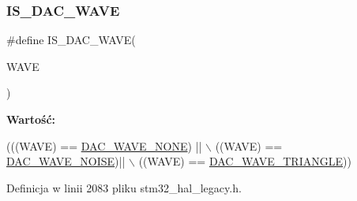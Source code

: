 \subsubsection{\texorpdfstring{I\+S\+\_\+\+D\+A\+C\+\_\+\+W\+A\+VE}{IS\_DAC\_WAVE}}
{\footnotesize\ttfamily \#define I\+S\+\_\+\+D\+A\+C\+\_\+\+W\+A\+VE(\begin{DoxyParamCaption}\item[{}]{W\+A\+VE }\end{DoxyParamCaption})}

{\bfseries Wartość\+:}
\begin{DoxyCode}
(((WAVE) == \hyperlink{group___h_a_l___d_a_c___aliased___defines_ga7e80010819867e162e936510093a4cef}{DAC\_WAVE\_NONE}) || \(\backslash\)
                          ((WAVE) == \hyperlink{group___h_a_l___d_a_c___aliased___defines_ga4585a41ff6dfd14971119283f1d8045b}{DAC\_WAVE\_NOISE})|| \(\backslash\)
                          ((WAVE) == \hyperlink{group___h_a_l___d_a_c___aliased___defines_ga8340be3743135476cb33a7daf7e6ace5}{DAC\_WAVE\_TRIANGLE}))
\end{DoxyCode}


Definicja w linii 2083 pliku stm32\+\_\+hal\+\_\+legacy.\+h.

